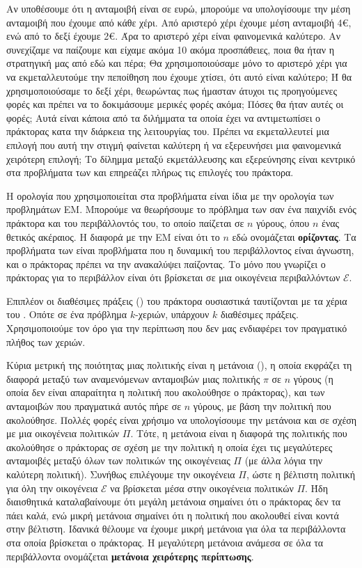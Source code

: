 Αν υποθέσουμε ότι η ανταμοιβή είναι σε ευρώ, μπορούμε να υπολογίσουμε την μέση ανταμοιβή που έχουμε από κάθε χέρι.
Από αριστερό χέρι έχουμε μέση ανταμοιβή 4€, ενώ από το δεξί έχουμε 2€. Άρα το αριστερό χέρι είναι φαινομενικά καλύτερο.
Aν συνεχίζαμε να παίζουμε και είχαμε ακόμα 10 ακόμα προσπάθειες, ποια θα ήταν η στρατηγική μας από εδώ και πέρα;
Θα χρησιμοποιούσαμε μόνο το αριστερό χέρι για να εκμεταλλευτούμε την πεποίθηση που έχουμε χτίσει, ότι αυτό είναι καλύτερο;
Ή θα χρησιμοποιούσαμε το δεξί χέρι, θεωρώντας πως ήμασταν άτυχοι τις προηγούμενες φορές και πρέπει να το δοκιμάσουμε μερικές φορές ακόμα;
Πόσες θα ήταν αυτές οι φορές; Αυτά είναι κάποια από τα διλήμματα τα οποία έχει να αντιμετωπίσει ο πράκτορας κατα την διάρκεια της λειτουργίας του.
Πρέπει να εκμεταλλευτεί μια επιλογή που αυτή την στιγμή φαίνεται καλύτερη ή να εξερευνήσει μια φαινομενικά χειρότερη επιλογή;
Το δίλημμα μεταξύ εκμετάλλευσης και εξερεύνησης είναι κεντρικό στα προβλήματα των  και επηρεάζει πλήρως τις επιλογές του πράκτορα.

Η ορολογία που χρησιμοποιείται στα προβλήματα  είναι ίδια με την ορολογία των προβλημάτων ΕΜ.
Μπορούμε να θεωρήσουμε το πρόβλημα των σαν ένα παιχνίδι ενός πράκτορα και του περιβάλλοντός του, το οποίο παίζεται
σε $n$ γύρους, όπου $n$ ένας θετικός ακέραιος. Η διαφορά με την ΕΜ είναι ότι το $n$ εδώ ονομάζεται \textbf{ορίζοντας}.
Τα προβλήματα των  είναι προβλήματα που η δυναμική του περιβάλλοντος είναι άγνωστη,
και ο πράκτορας πρέπει να την ανακαλύψει παίζοντας. Το μόνο που γνωρίζει ο πράκτορας για το περιβάλλον είναι ότι βρίσκεται
σε μια οικογένεια περιβαλλόντων $\mathcal{E}$.

Επιπλέον οι διαθέσιμες πράξεις () του πράκτορα ουσιαστικά ταυτίζονται με τα χέρια του . Οπότε σε ένα
πρόβλημα  $k$-χεριών, υπάρχουν $k$ διαθέσιμες πράξεις. Χρησιμοποιούμε τον όρο  για την περίπτωση
που δεν μας ενδιαφέρει τον πραγματικό πλήθος των χεριών.

Κύρια μετρική της ποιότητας μιας πολιτικής είναι η μετάνοια (), η οποία εκφράζει τη διαφορά μεταξύ των
αναμενόμενων ανταμοιβών μιας πολιτικής $π$ σε $n$ γύρους (η οποία δεν είναι απαραίτητα η πολιτική που ακολούθησε ο πράκτορας),
και των ανταμοιβών που πραγματικά αυτός πήρε σε $n$ γύρους, με βάση την πολιτική που ακολούθησε.
Πολλές φορές είναι χρήσιμο να υπολογίσουμε την μετάνοια και σε σχέση με μια οικογένεια πολιτικών $Π$.
Τότε, η μετάνοια είναι η διαφορά της πολιτικής που ακολούθησε ο πράκτορας σε σχέση με την πολιτική η οποία έχει τις μεγαλύτερες ανταμοιβές
μεταξύ όλων των πολιτικών της οικογένειας $Π$ (με άλλα λόγια την καλύτερη πολιτική). Συνήθως επιλέγουμε την οικογένεια $Π$, ώστε η βέλτιστη πολιτική
για όλη την οικογένεια $\mathcal{E}$ να βρίσκεται μέσα στην οικογένεια πολιτικών $Π$.
Ήδη διαισθητικά καταλαβαίνουμε ότι μεγάλη μετάνοια σημαίνει ότι ο πράκτορας δεν τα πάει καλά, ενώ μικρή μετάνοια σημαίνει
ότι η πολιτική που ακολουθεί είναι κοντά στην βέλτιστη. Ιδανικά θέλουμε να έχουμε μικρή μετάνοια για όλα τα περιβάλλοντα στα οποία βρίσκεται ο πράκτορας.
Η μεγαλύτερη μετάνοια ανάμεσα σε όλα τα περιβάλλοντα ονομάζεται \textbf{μετάνοια χειρότερης περίπτωσης}.

